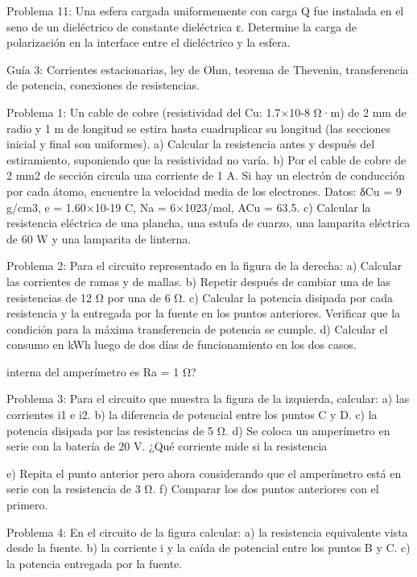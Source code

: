 Problema 11:
Una esfera cargada uniformemente con carga Q fue instalada en el seno de un dieléctrico de constante dieléctrica ε. Determine la carga de polarización en la interface entre el dieléctrico y la esfera.
 


Guía 3: Corrientes estacionarias, ley de Ohm, teorema de Thevenin, transferencia de potencia, conexiones de resistencias.

Problema 1:
Un cable de cobre (resistividad del Cu: 1.7×10-8 Ω·m) de 2 mm de radio y 1 m de longitud se estira hasta cuadruplicar su longitud (las secciones inicial y final son uniformes).
a)	Calcular la resistencia antes y después del estiramiento, suponiendo que la resistividad no varía.
b)	Por el cable de cobre de 2 mm2 de sección circula una corriente de 1 A. Si hay un electrón
de conducción por cada átomo, encuentre la velocidad media de los electrones. Datos: δCu = 9 g/cm3, e = 1.60×10-19 C, Na = 6×1023/mol, ACu = 63.5.
c)	Calcular  la  resistencia  eléctrica  de  una  plancha,  una  estufa  de  cuarzo,  una  lamparita
eléctrica de 60 W y una lamparita de linterna.



Problema 2:
Para el circuito representado en la figura de la derecha:
a)	Calcular las corrientes de ramas y de mallas.
b)	Repetir después de cambiar una de las resistencias de 12 Ω por una de 6 Ω.
c)	Calcular la potencia disipada por cada resistencia y la entregada
por  la  fuente  en  los  puntos  anteriores.  Verificar  que  la  condición  para  la  máxima transferencia de potencia se cumple.
d)	Calcular el consumo en kWh luego de dos días de funcionamiento en los dos casos.



 

 

interna del amperímetro es Ra = 1 Ω?
 
Problema 3:
Para el circuito que muestra la figura de la izquierda, calcular:
a)	las corrientes i1 e i2.
b)	la diferencia de potencial entre los puntos C y D.
c)	la potencia disipada por las resistencias de 5 Ω.
d)	Se coloca un amperímetro en serie con la batería
de 20 V.	¿Qué corriente mide si la resistencia
 
e)	Repita el punto anterior pero ahora considerando que el amperímetro está en serie con la
resistencia de 3 Ω.
f)	Comparar los dos puntos anteriores con el primero.



Problema 4:
En el circuito de la figura calcular:
a)	la resistencia equivalente vista desde la fuente.
b)	la corriente i y la caída de potencial entre los puntos B y C.
c)	la potencia entregada por la fuente.
 


